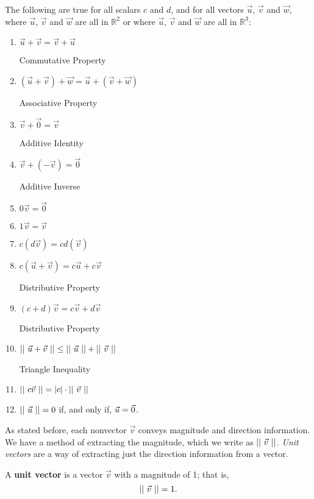 {The following are true for all scalars $c$ and $d$, and for all vectors $\vec u$, $\vec v$ and $\vec w$, where $\vec u$, $\vec v$ and $\vec w$ are all in $\mathbb{R}^2$ or where $\vec u$, $\vec v$ and $\vec w$ are all in $\mathbb{R}^3$:
\begin{enumerate}
	\item \parbox{150pt}{$\vec u+\vec v = \vec v+\vec u$}Commutative Property
	\item \parbox{150pt}{$(\vec u+\vec v)+\vec w = \vec u+(\vec v+\vec w)$}Associative Property
	\item \parbox{150pt}{$\vec v+\vec 0 = \vec v$}Additive Identity
	\item \parbox{150pt}{$\vec v+ (-\vec v) = \vec 0$}Additive Inverse
		\item \parbox{150pt}{$0\vec v = \vec 0$}
	\item \parbox{150pt}{$1\vec v = \vec v$}
	\item \parbox{150pt}{$c(d\vec v) = cd(\vec v)$}
	\item \parbox{150pt}{$c(\vec u+\vec v) = c\vec u+c\vec v$}Distributive Property
	\item \parbox{150pt}{$(c+d)\vec v = c\vec v+d\vec v$}Distributive Property
	\item \parbox{150pt}{$||\ \vec u+\vec v\ ||\leq ||\ \vec u\ ||+||\ \vec v\ ||$}Triangle Inequality
	\item	\parbox{150pt}{$||\ c\vec v\ || = |c|\cdot||\ \vec v\ ||$}\label{thm:norm_prop}
	\item	$||\ \vec u\ || = 0$ if, and only if, $\vec u = \vec 0$.  \label{thm:zero_norm}
\end{enumerate}
}

%

As stated before, each nonvector $\vec v$ conveys magnitude and direction information. We have a method of extracting the magnitude, which we write as $||\ \vec v\ ||$. \textit{Unit vectors} are a way of extracting just the direction information from a vector.

{A \textbf{unit vector} is a vector $\vec v$ with a magnitude of 1; that is, 
$$||\ \vec v\ ||=1.$$
}

